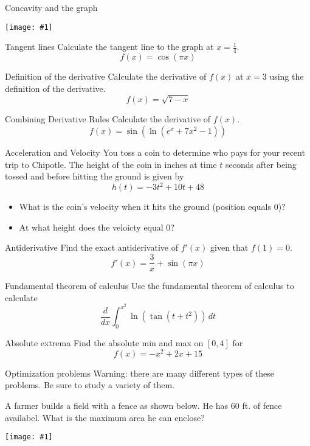 \documentclass[t]{beamer}
\newcommand{\img}[1]{
\vfill
\begin{center}
\texttt{[image: \#1]}
\end{center}
\vfill
}
\begin{document}
\begin{frame}{Concavity and the graph}
\img{fr2}
\end{frame}

\begin{frame}{Tangent lines}
Calculate the tangent line to the graph at $x = \frac{1}{4}$.
$$f(x) = \cos(\pi x)$$
\end{frame}

\begin{frame}{Definition of the derivative}
Calculate the derivative of $f(x)$ at $x = 3$ using
the definition of the derivative.
$$f(x) = \sqrt{7 - x}$$
\end{frame}

\begin{frame}{Combining Derivative Rules}
Calculate the derivative of $f(x)$.
$$f(x) = \sin(\ln(e^x + 7x^2 - 1))$$
\end{frame}

\begin{frame}{Acceleration and Velocity}
You toss a coin to determine who pays for your recent trip
to Chipotle.  The height of the coin in inches at time $t$ seconds
after being tossed and before hitting the ground is given by
$$h(t) = -3 t^2 + 10t + 48$$
\begin{itemize}
\item What is the coin's velocity when it hits the ground
(position equals 0)?
\item At what height does the veloicty equal 0?
\end{itemize}
\end{frame}

\begin{frame}{Antiderivative}
Find the exact antiderivative of $f'(x)$ given that $f(1) = 0$.
$$f'(x) = \frac{3}{x} + \sin(\pi x)$$
\end{frame}

\begin{frame}{Fundamental theorem of calculus}
Use the fundamental theorem of calculus to calculate
$$\frac{d}{dx} \int_0^{x^2} \ln(\tan(t + t^2)) \, dt $$
\end{frame}

\begin{frame}{Absolute extrema}
Find the absolute min and max on $[0,4]$ for
$$f(x) = -x^2 + 2x + 15$$
\end{frame}

\begin{frame}{Optimization problems}
Warning: there are many different types of these problems.
Be sure to study a variety of them.

A farmer builds a field with a fence as shown below.  He 
has 60 ft. of fence availabel.  What is the maximum area he can 
enclose?

\img{fr3}
\end{frame}
\end{document}
